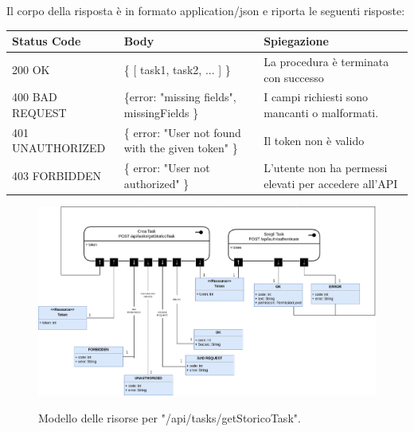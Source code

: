 \documentclass{report}
\begin{document}
Il corpo della risposta è in formato application/json e riporta le seguenti risposte:

\begin{center} %
	\centering
	\begin{tabular}{ |p{4cm}|p{4cm}|p{4cm}| }
		\hline
		\centering Status Code & \qquad\qquad\quad Body & \qquad\quad Spiegazione\\ %
		\hline
		200 OK & \{ [ task1, task2, ... ] \}  & La procedura è terminata con successo	\\ 
		\hline
		400 BAD REQUEST & \{error: "missing fields", missingFields \} & I campi richiesti sono mancanti o malformati. \\
		\hline
		401 UNAUTHORIZED & \{ error: "User not found with the given token" \} & Il token non è valido \\
		\hline
		403 FORBIDDEN & \{ error: "User not authorized" \} &  L'utente non ha permessi elevati per accedere all'API \\
		\hline
	\end{tabular}
\end{center}


\begin{figure}[H]
	\centering\includegraphics[width=1\textwidth]{images/model_storico_task.png}
	
	Modello delle risorse per "/api/tasks/getStoricoTask".
\end{figure}
\end{document}
